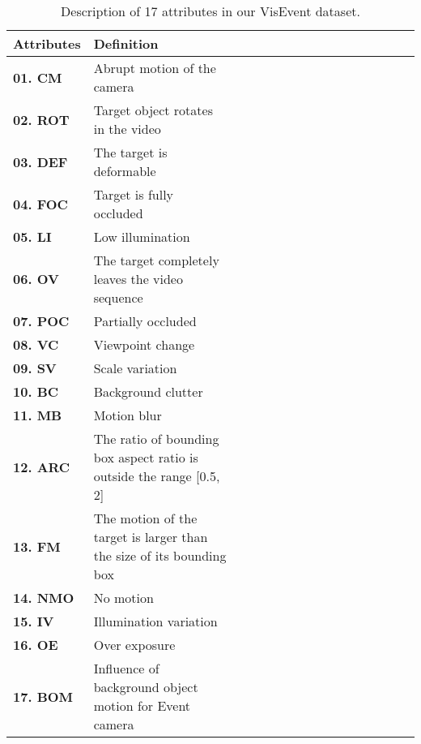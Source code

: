 \documentclass[journal]{IEEEtran}
\begin{document}
\begin{table}
\center
\scriptsize 
\caption{Description of 17 attributes in our VisEvent dataset.} \label{AttributeList}
\begin{tabular}{l|lcccccccccccccc}
\hline \toprule [0.8 pt]
\textbf{Attributes}    &\textbf{Definition}  \\ 
\hline
\textbf{01. CM}   	    	&Abrupt motion of the camera \\	
\textbf{02. ROT}   	    &Target object rotates in the video \\	
\textbf{03. DEF}   	    &The target is deformable \\	
\textbf{04. FOC}   	    &Target is fully occluded \\
\textbf{05. LI}   	    	&Low illumination \\ 
\textbf{06. OV}   	    	&The target completely leaves the video sequence \\ 
\textbf{07. POC}   	    &Partially occluded  \\
\textbf{08. VC}   	    	&Viewpoint change  \\
\textbf{09. SV}   	    	&Scale variation  \\
\textbf{10. BC}   	    	&Background clutter  \\
\textbf{11. MB}   	    	&Motion blur  \\
\textbf{12. ARC}   	    &The ratio of bounding box aspect ratio is outside the range [0.5, 2]   \\
\textbf{13. FM}   	    	&The motion of the target is larger than the size of its bounding box  \\
\textbf{14. NMO}   	    &No motion  \\
\textbf{15. IV}				&Illumination variation  \\ 
\textbf{16. OE}			&Over exposure  \\ 
\textbf{17. BOM}         &Influence of background object motion for Event camera \\ 
\hline \toprule [0.8 pt]
\end{tabular}
\end{table}	
\end{document}
